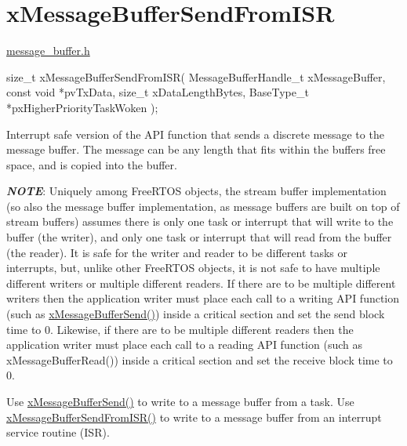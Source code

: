 \hypertarget{group__x_message_buffer_send_from_i_s_r}{}\section{x\+Message\+Buffer\+Send\+From\+I\+SR}
\label{group__x_message_buffer_send_from_i_s_r}
\hyperlink{message__buffer_8h}{message\+\_\+buffer.\+h}


\begin{DoxyPre}
size\_t xMessageBufferSendFromISR( MessageBufferHandle\_t xMessageBuffer,
                               const void *pvTxData,
                               size\_t xDataLengthBytes,
                               BaseType\_t *pxHigherPriorityTaskWoken );
\end{DoxyPre}


Interrupt safe version of the A\+PI function that sends a discrete message to the message buffer. The message can be any length that fits within the buffer\textquotesingle{}s free space, and is copied into the buffer.

{\itshape {\bfseries N\+O\+TE}}\+: Uniquely among Free\+R\+T\+OS objects, the stream buffer implementation (so also the message buffer implementation, as message buffers are built on top of stream buffers) assumes there is only one task or interrupt that will write to the buffer (the writer), and only one task or interrupt that will read from the buffer (the reader). It is safe for the writer and reader to be different tasks or interrupts, but, unlike other Free\+R\+T\+OS objects, it is not safe to have multiple different writers or multiple different readers. If there are to be multiple different writers then the application writer must place each call to a writing A\+PI function (such as \hyperlink{message__buffer_8h_a858f6da6fe24a226c45caf1634ea1605}{x\+Message\+Buffer\+Send()}) inside a critical section and set the send block time to 0. Likewise, if there are to be multiple different readers then the application writer must place each call to a reading A\+PI function (such as x\+Message\+Buffer\+Read()) inside a critical section and set the receive block time to 0.

Use \hyperlink{message__buffer_8h_a858f6da6fe24a226c45caf1634ea1605}{x\+Message\+Buffer\+Send()} to write to a message buffer from a task. Use \hyperlink{message__buffer_8h_aeef5b0c4f8c2db6ca2230a8874813e79}{x\+Message\+Buffer\+Send\+From\+I\+S\+R()} to write to a message buffer from an interrupt service routine (I\+SR).


